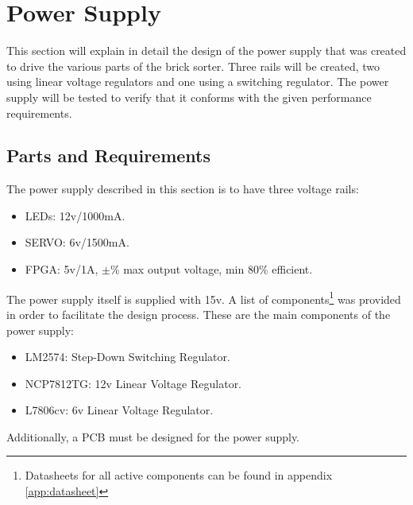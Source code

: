 \section{Power Supply}
This section will explain in detail the design of the power supply that was created to drive the various parts of the brick sorter. Three rails will be created, two using linear voltage regulators and one using a switching regulator. The power supply will be tested to verify that it conforms with the given performance requirements.
\subsection{Parts and Requirements}
The power supply described in this section is to have three voltage rails:
\begin{itemize}
	\item LEDs: 12v/1000mA.
	\item SERVO: 6v/1500mA.
	\item FPGA: 5v/1A, $\pm$\% max output voltage, min 80\% efficient.
\end{itemize}
The power supply itself is supplied with 15v. A list of components\footnote{Datasheets for all active components can be found in appendix \ref{app:datasheet}} was provided in order to facilitate the design process. These are the main components of the power supply:
\begin{itemize}
	\item LM2574: Step-Down Switching Regulator.
	\item NCP7812TG: 12v Linear Voltage Regulator.
	\item L7806cv: 6v Linear Voltage Regulator. 
\end{itemize}
Additionally, a PCB must be designed for the power supply.
